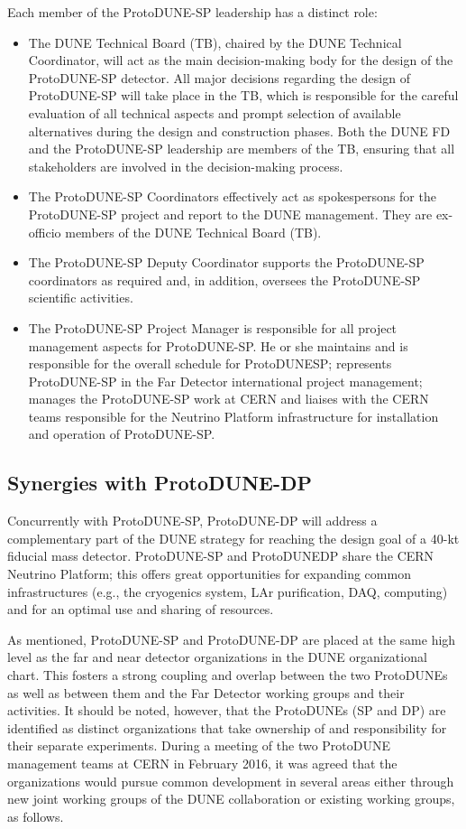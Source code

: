 Each member of the ProtoDUNE-SP leadership has a distinct role:
\begin{itemize}
\item The DUNE Technical Board (TB), chaired by the DUNE Technical Coordinator, will act as the main decision-making body for the design of the ProtoDUNE-SP detector. All major decisions regarding the design of ProtoDUNE-SP will take place in the TB, which is responsible for the careful evaluation of all technical aspects and prompt selection of available alternatives during the design and construction phases. Both the DUNE FD and the ProtoDUNE-SP leadership are members of the TB, ensuring that all stakeholders are involved in the decision-making process.
\item The ProtoDUNE-SP Coordinators effectively act as spokespersons for the ProtoDUNE-SP project and report to the DUNE management. They are ex-officio members of the DUNE Technical Board (TB).
\item The ProtoDUNE-SP Deputy Coordinator supports the ProtoDUNE-SP coordinators as required and, in addition, oversees the ProtoDUNE-SP scientific activities. 
\item The ProtoDUNE-SP Project Manager is responsible for all project management aspects for ProtoDUNE-SP. He or she maintains and is responsible for the overall schedule for ProtoDUNESP; represents ProtoDUNE-SP in the Far Detector international project management; manages the ProtoDUNE-SP work at CERN and liaises with the CERN teams responsible for the Neutrino Platform infrastructure for installation and operation of ProtoDUNE-SP.
\end{itemize}

\subsection{Synergies with ProtoDUNE-DP}

Concurrently with ProtoDUNE-SP, ProtoDUNE-DP will address a complementary part of the DUNE strategy for reaching the design goal of a 40-kt fiducial mass detector. ProtoDUNE-SP and ProtoDUNEDP share the CERN Neutrino Platform; this offers great opportunities for expanding common infrastructures (e.g., the cryogenics system, LAr purification, DAQ, computing) and for an optimal use and sharing of resources.

As mentioned, ProtoDUNE-SP and ProtoDUNE-DP are placed at the same high level as the far and near detector organizations in the DUNE organizational chart. This fosters a strong coupling and overlap between the two ProtoDUNEs as well as between them and the Far Detector working groups and their activities. It should be noted, however, that the ProtoDUNEs (SP and DP) are identified as distinct organizations that take ownership of and responsibility for their separate experiments.
During a meeting of the two ProtoDUNE management teams at CERN in February 2016, it was agreed that the organizations would pursue common development in several areas either through new joint working groups of the DUNE collaboration or existing working groups, as follows. 

